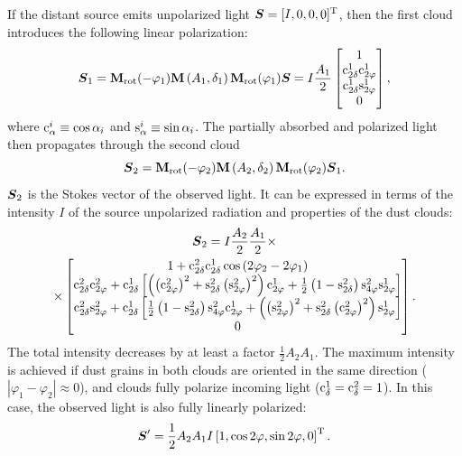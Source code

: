 If the distant source emits unpolarized light $\boldsymbol{S} = [I, 0, 0, 0]^{\mathrm{T}}$, then the first cloud introduces the following linear polarization:
\begin{equation}
    \boldsymbol{S}_1 = \mathbf{M}_{\mathrm{rot}}(-\varphi_1) \mathbf{M}\left(A_1, \delta_1\right)  \mathbf{M}_{\mathrm{rot}}(\varphi_1) \boldsymbol{S} = I\frac{A_1}{2}
    \begin{bmatrix}
        1\\
        \mathrm{c}^{1}_{2\delta}\mathrm{c}^{1}_{2\varphi}\\
        \mathrm{c}^{1}_{2\delta}\mathrm{s}^{1}_{2\varphi}\\
        0\\
    \end{bmatrix},
\end{equation}
where $\mathrm{c}^{i}_{\alpha} \equiv \cos\alpha_i$ and $\mathrm{s}^{i}_{\alpha} \equiv \sin\alpha_i$.
The partially absorbed and polarized light then propagates through the second cloud
\begin{equation}
    \boldsymbol{S}_2 = \mathbf{M}_{\mathrm{rot}}(-\varphi_2) \mathbf{M}\left(A_2, \delta_2\right)  \mathbf{M}_{\mathrm{rot}}(\varphi_2) \boldsymbol{S}_1.
\end{equation}
$\boldsymbol{S}_2$ is the Stokes vector of the observed light.
It can be expressed in terms of the intensity $I$ of the source unpolarized radiation and properties of the dust clouds:
\begin{multline}
    \vctr{S}_2 = I\frac{A_2}{2}\frac{A_1}{2} \times \\
    \times 
    \begin{bmatrix}
        1 + \cs{2}{2\delta}\cs{1}{2\delta}\cos\left(2\varphi_2 - 2\varphi_1\right) \\
%
        \cs{2}{2\delta}\cs{2}{2\varphi} + \cs{1}{2\delta}\left[\left(\left(\cs{2}{2\varphi}\right)^2 + \sn{2}{2\delta}\left(\sn{2}{2\varphi}\right)^2\right)\cs{1}{2\varphi} + \frac{1}{2}\left(1 - \sn{2}{2\delta}\right)\sn{2}{4\varphi}\sn{1}{2\varphi}\right]\\
%
        \cs{2}{2\delta}\sn{2}{2\varphi} + \cs{1}{2\delta}\left[\frac{1}{2}\left(1 - \sn{2}{2\delta}\right)\sn{2}{4\varphi}\cs{1}{2\varphi} + \left(\left(\sn{2}{2\varphi}\right)^2 + \sn{2}{2\delta}\left(\cs{2}{2\varphi}\right)^2 \right)\sn{1}{2\varphi}\right] \\
%
        0
    \end{bmatrix}.
\end{multline}
The total intensity decreases by at least a factor $\frac{1}{2}A_2A_1$.
The maximum intensity is achieved if dust grains in both clouds are oriented in the same direction ($\left|\varphi_1 - \varphi_2\right| \approx 0$), and clouds fully polarize incoming light ($\mathrm{c}^{1}_{\delta} = \mathrm{c}^{2}_{\delta} = 1$).
In this case, the observed light is also fully linearly polarized:
\begin{equation}
    \boldsymbol{S}^\prime = \frac{1}{2}A_2A_1I \left[1, \cos2\varphi, \sin2\varphi, 0\right]^{\mathrm{T}}.
\end{equation}


